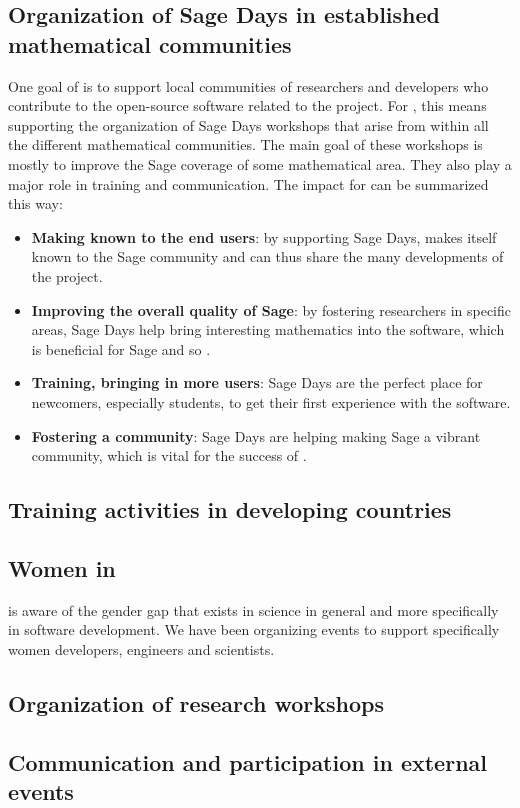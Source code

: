 \documentclass{deliverablereport}
\begin{document}
\subsection{Organization of Sage Days in established mathematical communities}

One goal of \ODK is to support local communities of researchers
and developers who contribute to the open-source software related to
the project. For \Sage, this means supporting the organization of Sage Days
workshops that arise from within all the different mathematical communities. The main 
goal of these workshops is mostly to improve the Sage coverage of some mathematical
area. They also play a major role in training and communication. The
impact for \ODK can be summarized this way:

\begin{itemize}
\item \textbf{Making \ODK known to the end users}: by supporting Sage Days,
\ODK makes itself known to the Sage community and can
thus share the many developments of the project.

\item \textbf{Improving the overall quality of Sage}: by fostering researchers
in specific areas, Sage Days help bring interesting mathematics into
the software, which is beneficial for Sage and so \ODK.

\item \textbf{Training, bringing in more users}: Sage Days are the perfect place
for newcomers, especially students, to get their first experience with the software.

\item \textbf{Fostering a community}: Sage Days are helping making Sage a vibrant
community, which is vital for the success of \ODK.
\end{itemize}



\subsection{Training activities in developing countries}



\subsection{Women in \ODK}

\ODK is aware of the gender gap that exists in science in general
and more specifically in software development. We have been organizing
events to support specifically women developers, engineers and scientists.



\subsection{Organization of research workshops}



\subsection{Communication and participation in external events}





\end{document}
